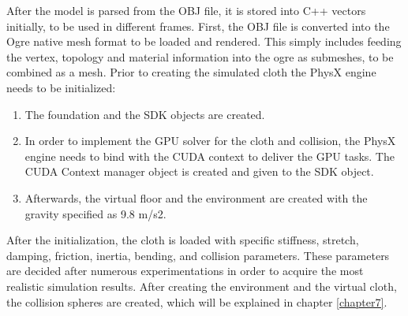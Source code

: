 After the model is parsed from the OBJ file, it is stored into C++ vectors initially, to be used in different frames. First, the OBJ file is converted into the Ogre native mesh format to be loaded and rendered. This simply includes feeding the vertex, topology and material information into the ogre as submeshes, to be combined as a mesh.
Prior to creating the simulated cloth the PhysX engine needs to be initialized:

\begin{enumerate}
\item The foundation and the SDK objects are created.
\item In order to implement the GPU solver for the cloth and collision, the PhysX engine needs to bind with the CUDA context to deliver the GPU tasks. The CUDA Context manager object is created and given to the SDK object.
\item Afterwards, the virtual floor and the environment are created with the gravity specified as 9.8 m/s2. 
\end{enumerate}

After the initialization, the cloth is loaded with specific stiffness, stretch, damping, friction, inertia, bending, and collision parameters. These parameters are decided after numerous experimentations in order to acquire the most realistic simulation results.
After creating the environment and the virtual cloth, the collision spheres are created, which will be explained in chapter \ref{chapter7}.

